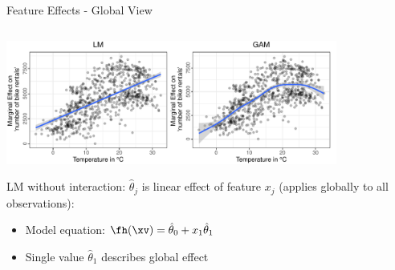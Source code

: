 \documentclass[11pt,compress,t,notes=noshow, aspectratio=169, xcolor=table]{beamer}
\begin{document}



\begin{frame}{Feature Effects - Global View}

\begin{columns}[T, totalwidth=\textwidth]
\begin{column}{0.49\linewidth}
\includegraphics[width=0.85\textwidth, trim=0cm 0.1cm 10.4cm 0cm, clip]{figure/lm_main_effects}

\bigskip
LM without interaction: $\hat\theta_j$ is linear effect of feature $x_j$ (applies globally to all observations):
\begin{itemize}
    \item Model equation: $\fh(\xv) = \hat\theta_0 + x_1\hat\theta_1$
    \item Single value $\hat\theta_1$ describes global effect
\end{itemize}
\end{column}\pause
\begin{column}{0.49\linewidth}


\end{column}
\end{columns}
\end{frame}
\end{document}
